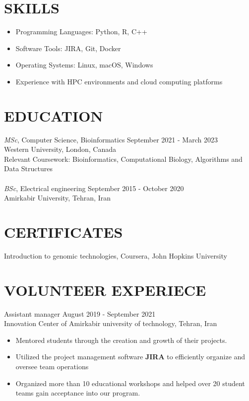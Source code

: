 \documentclass[line, margin]{res}
\begin{document}
\begin{resume}
  \section{SKILLS}
  \begin{itemize} \itemsep -2pt
  \item Programming Languages: Python, R, C++
  \item Software Tools: JIRA, Git, Docker
  \item Operating Systems: Linux, macOS, Windows
  \item Experience with HPC environments and cloud computing platforms
  \end{itemize}

\section{EDUCATION}
{\sl MSc}, Computer Science, Bioinformatics \hfill September 2021 - March 2023\\
Western University, London, Canada \\
Relevant Coursework: Bioinformatics, Computational Biology, Algorithms and Data Structures
\\ \\
{\sl BSc}, Electrical engineering \hfill September 2015 - October 2020\\
Amirkabir University, Tehran, Iran 
\section{CERTIFICATES}
Introduction to genomic technologies, Coursera, John Hopkins University
\section{VOLUNTEER EXPERIECE}
Assistant manager \hfill August 2019 - September 2021 \\
Innovation Center of Amirkabir university of technology, Tehran, Iran 
\begin{itemize}\itemsep -2pt
\item Mentored students through the creation and growth of their projects.
\item Utilized the project management software \textbf{JIRA} to efficiently organize and oversee team operations 
\item Organized more than 10 educational workshops and helped over 20 student teams gain acceptance into our program.
\end{itemize}
\end{resume}
\end{document}
